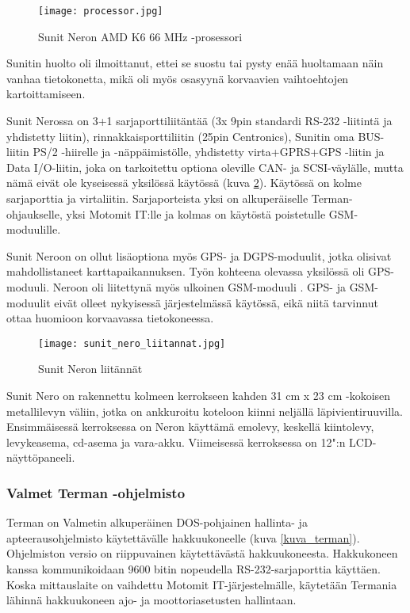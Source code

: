 \begin{figure}[H]
\centering
\texttt{[image: processor.jpg]}
\caption{Sunit Neron AMD K6 66 MHz -prosessori}
\label{kuva_prossu}
\end{figure}

Sunitin huolto oli ilmoittanut, ettei se suostu tai pysty enää huoltamaan näin vanhaa tietokonetta, mikä oli myös osasyynä korvaavien vaihtoehtojen kartoittamiseen.

Sunit Nerossa on 3+1 sarjaporttiliitäntää (3x 9pin standardi RS-232 -liitintä ja yhdistetty liitin), rinnakkaisporttiliitin (25pin Centronics), Sunitin oma BUS-liitin PS/2 -hiirelle ja -näppäimistölle, yhdistetty virta+GPRS+GPS -liitin ja Data I/O-liitin, joka on tarkoitettu optiona oleville CAN- ja SCSI-väylälle, mutta nämä eivät ole kyseisessä yksilössä käytössä (kuva \ref{kuva_liitannat}).  Käytössä on kolme sarjaporttia ja virtaliitin. Sarjaporteista yksi on alkuperäiselle Terman-ohjaukselle, yksi Motomit IT:lle ja kolmas on käytöstä poistetulle GSM-moduulille.

Sunit Neroon on ollut lisäoptiona myös GPS- ja DGPS-moduulit, jotka olisivat mahdollistaneet karttapaikannuksen. Työn kohteena olevassa yksilössä oli GPS-moduuli. Neroon oli liitettynä myös ulkoinen GSM-moduuli \cite{nero:manual}. GPS- ja GSM-moduulit eivät olleet nykyisessä järjestelmässä käytössä, eikä niitä tarvinnut ottaa huomioon korvaavassa tietokoneessa.\newline\newline

\begin{figure}[H]
\centering
\texttt{[image: sunit\_nero\_liitannat.jpg]}
\caption{Sunit Neron liitännät}
\label{kuva_liitannat}
\end{figure}

Sunit Nero on rakennettu kolmeen kerrokseen kahden 31 cm x 23 cm -kokoisen metallilevyn väliin, jotka on ankkuroitu koteloon kiinni neljällä  läpivientiruuvilla. Ensimmäisessä kerroksessa on Neron käyttämä emolevy, keskellä kiintolevy, levykeasema, cd-asema ja vara-akku. Viimeisessä kerroksessa on 12":n LCD-näyttöpaneeli.

\subsubsection{Valmet Terman -ohjelmisto}
Terman on Valmetin alkuperäinen DOS-pohjainen hallinta- ja apteerausohjelmisto käytettävälle hakkuukoneelle (kuva \ref{kuva_terman}). Ohjelmiston versio on riippuvainen käytettävästä hakkuukoneesta. Hakkukoneen kanssa kommunikoidaan 9600 bitin nopeudella RS-232-sarjaporttia käyttäen. Koska mittauslaite on vaihdettu Motomit IT-järjestelmälle, käytetään Termania lähinnä hakkuukoneen ajo- ja moottoriasetusten hallintaan.
\newline\newline

